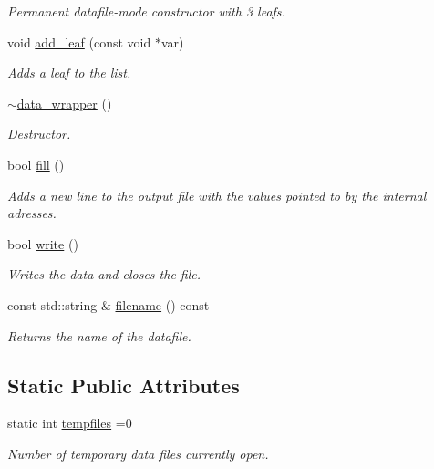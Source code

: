 \begin{DoxyCompactItemize}
\begin{DoxyCompactList}\small\item\em Permanent datafile-\/mode constructor with 3 leafs. \end{DoxyCompactList}\item 
\hypertarget{a00118_a6bb7c7096f4de9dfdc94be87905030ea}{void \hyperlink{a00118_a6bb7c7096f4de9dfdc94be87905030ea}{add\-\_\-leaf} (const void $\ast$var)}\label{a00118_a6bb7c7096f4de9dfdc94be87905030ea}

\begin{DoxyCompactList}\small\item\em Adds a leaf to the list. \end{DoxyCompactList}\item 
\hyperlink{a00118_a70646ebd26014836e10ff3784ad02242}{$\sim$data\-\_\-wrapper} ()
\begin{DoxyCompactList}\small\item\em Destructor. \end{DoxyCompactList}\item 
bool \hyperlink{a00118_a6217a30f13b132cc08a9ee95d69d0257}{fill} ()
\begin{DoxyCompactList}\small\item\em Adds a new line to the output file with the values pointed to by the internal adresses. \end{DoxyCompactList}\item 
\hypertarget{a00118_af244d017966e0f501e50fb128c70802b}{bool \hyperlink{a00118_af244d017966e0f501e50fb128c70802b}{write} ()}\label{a00118_af244d017966e0f501e50fb128c70802b}

\begin{DoxyCompactList}\small\item\em Writes the data and closes the file. \end{DoxyCompactList}\item 
\hypertarget{a00118_a58d39a55d0c474cf39c3bac05709baab}{const std\-::string \& \hyperlink{a00118_a58d39a55d0c474cf39c3bac05709baab}{filename} () const }\label{a00118_a58d39a55d0c474cf39c3bac05709baab}

\begin{DoxyCompactList}\small\item\em Returns the name of the datafile. \end{DoxyCompactList}\end{DoxyCompactItemize}
\subsection*{Static Public Attributes}
\begin{DoxyCompactItemize}
\item 
\hypertarget{a00118_a2fe73dd80dc53dad660853b7d787d94e}{static int \hyperlink{a00118_a2fe73dd80dc53dad660853b7d787d94e}{tempfiles} =0}\label{a00118_a2fe73dd80dc53dad660853b7d787d94e}

\begin{DoxyCompactList}\small\item\em Number of temporary data files currently open. \end{DoxyCompactList}\end{DoxyCompactItemize}


